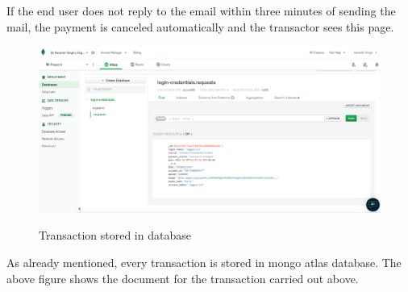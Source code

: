 \documentclass[12pt, oneside, a4paper]{article}
\begin{document}
If the end user does not reply to the email within three minutes of sending the mail, the payment is canceled automatically and the transactor sees this page.

\vspace{0.7cm}

\begin{figure}[H]
\begin{center}
\includegraphics[width=1\textwidth]{Atlas.png}\\
\caption{Transaction stored in database}
\label{fig:Figure 18}
\end{center}
\end{figure} 

As already mentioned, every transaction is stored in mongo atlas database. The above figure shows the document for the transaction carried out above.



\pagebreak

\vspace{0.5cm}
\end{document}
